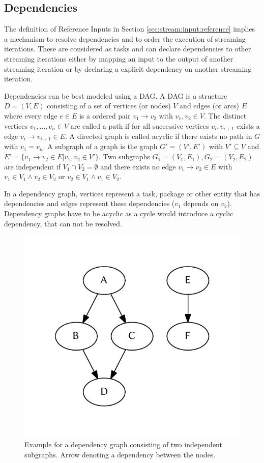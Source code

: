 	\subsection{Dependencies}
		\label{sec:stream:dependencies}
		The definition of Reference Inputs in Section \ref{sec:stream:input:reference} implies a mechanism to resolve dependencies and to order the execution of streaming iterations. These are considered as tasks and can declare dependencies to other streaming iterations either by mapping an input to the output of another streaming iteration or by declaring a explicit dependency on another streaming iteration.

		Dependencies can be best modeled using a \ac{DAG}. A \ac{DAG} is a structure $D=(V, E)$ consisting of a set of vertices (or nodes) $V$ and edges (or arcs) $E$ where every edge $e\in E$ is a ordered pair $v_1 \rightarrow v_2$ with $v_1, v_2 \in V$. The distinct vertices $v_1,\dots,v_n\in V$ are called a path if for all successive vertices $v_i, v_{i+1}$ exists a edge $v_i \rightarrow v_{i+1} \in E$. A directed graph is called acyclic if there exists no path in $G$ with $v_1 = v_n$. A subgraph of a graph is the graph $G' = (V', E')$ with $V'\subseteq V$ and $E' = \{v_1 \rightarrow v_2 \in E | v_1, v_2\in V'\}$. Two subgraphs $G_1 = (V_1, E_1), G_2 = (V_2, E_2)$ are independent if $V_1 \cap V_2 = \emptyset$ and there exists no edge $v_1\rightarrow v_2\in E$ with $v_1\in V_1 \wedge v_2\in V_2$ or $v_2\in V_1 \wedge v_1\in V_2$.

		In a dependency graph, vertices represent a task, package or other entity that has dependencies and edges represent these dependencies ($v_1$ depends on $v_2$). Dependency graphs have to be acyclic as a cycle would introduce a cyclic dependency, that can not be resolved.

		\begin{figure}[!htb]
			\centering
			\includegraphics[width=.4474\textwidth]{figures/unordered-graph.pdf} %
			\caption{\label{fig:graph:unordered} Example for a dependency graph consisting of two independent subgraphs. Arrow denoting a dependency between the nodes.}
		\end{figure}


